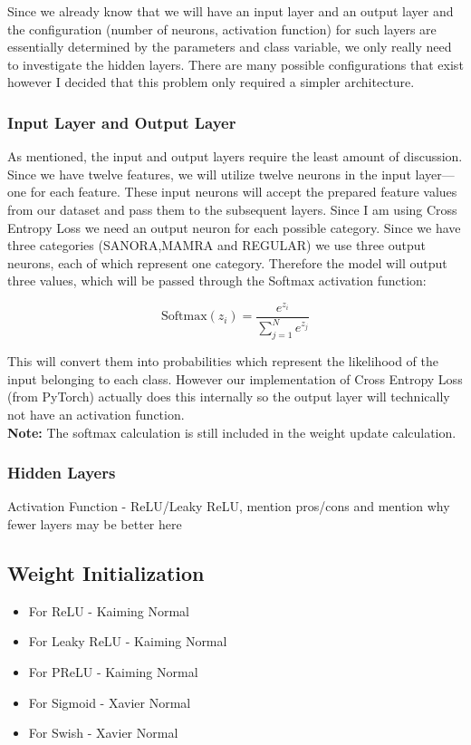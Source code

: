 \documentclass[conference]{IEEEtran}
\begin{document}
Since we already know that we will have an input layer and an output layer and the configuration (number of neurons, activation function) for such layers are essentially determined by the parameters and class variable, we only really need to investigate the hidden layers. There are many possible configurations that exist however I decided that this problem only required a simpler architecture. \\
\subsubsection{Input Layer and Output Layer}
As mentioned, the input and output layers require the least amount of discussion. Since we have twelve features, we will utilize twelve neurons in the input layer—one for each feature. These input neurons will accept the prepared feature values from our dataset and pass them to the subsequent layers. Since I am using Cross Entropy Loss we need an output neuron for each possible category. Since we have three categories (SANORA,MAMRA and REGULAR) we use three output neurons, each of which represent one category. Therefore the model will output three values, which will be passed through the Softmax activation function:
 
\[
\text{Softmax}(z_i) = \frac{e^{z_i}}{\sum_{j=1}^{N} e^{z_j}}
\]

This will convert them into probabilities which represent the likelihood of the input belonging to each class. However our implementation of Cross Entropy Loss (from PyTorch) actually does this internally so the output layer will technically not have an activation function.\\

\textbf{Note:} The softmax calculation is still included in the weight update calculation.\\

\subsubsection{Hidden Layers}
Activation Function - ReLU/Leaky ReLU, mention pros/cons and mention why fewer layers may be better here

\subsection{Weight Initialization}
\begin{itemize}
\item For ReLU - Kaiming Normal
\item For Leaky ReLU - Kaiming Normal
\item For PReLU - Kaiming Normal
\item For Sigmoid - Xavier Normal
\item For Swish - Xavier Normal
\end{itemize}
\end{document}
